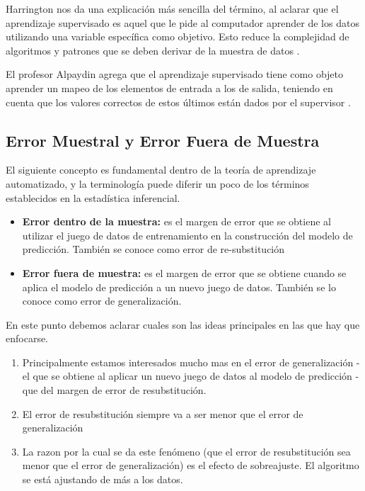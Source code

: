 Harrington nos da una explicación más sencilla del término, al aclarar que el aprendizaje supervisado es aquel que le pide al computador aprender de los datos utilizando una variable específica como objetivo. Esto reduce la complejidad de algoritmos y patrones que se deben derivar de la muestra de datos \cite{harrington}. 

El profesor Alpaydin agrega que el aprendizaje supervisado tiene como objeto aprender un mapeo de los elementos de entrada a los de salida, teniendo en cuenta que los valores correctos de estos últimos están dados por el supervisor \cite{alpaydin}.

\subsection{Error Muestral y Error Fuera de Muestra}
El siguiente concepto es fundamental dentro de la teoría de aprendizaje automatizado, y la terminología puede diferir un poco de los términos establecidos en la estadística inferencial.

	\begin{itemize}
		\item \textbf{Error dentro de la muestra:} es el margen de error que se obtiene al utilizar el juego de datos de entrenamiento en la construcción del modelo de predicción. También se conoce como error de re-substitución 
		\item  \textbf{Error fuera de muestra:} es el margen de error que se obtiene cuando se aplica el modelo de predicción a un nuevo juego de datos. También se lo conoce como error de generalización. 
	\end{itemize}


En este punto debemos aclarar cuales son las ideas principales en las que hay que enfocarse. 

\begin{enumerate}
	\item Principalmente estamos interesados mucho mas en el error de generalización - el que se obtiene al aplicar un nuevo juego de datos al modelo de predicción - que del margen de error de resubstitución.
	\item El error de resubstitución siempre va a ser menor que el error de generalización 
	\item La razon por la cual se da este fenómeno (que el error de resubstitución sea menor que el error de generalización) es el efecto de sobreajuste. El algoritmo se está ajustando de más a los datos.
\end{enumerate}

